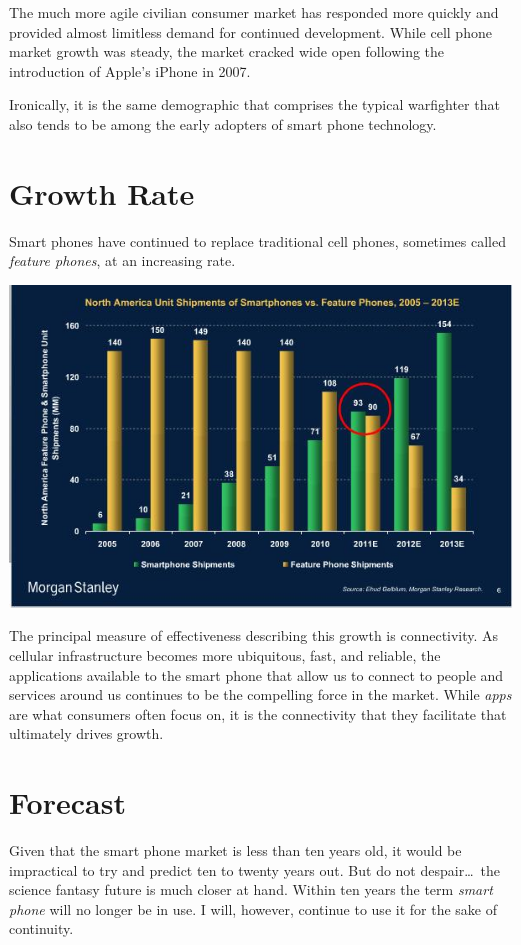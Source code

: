 \documentclass[letterpaper,12pt]{article}
\begin{document}
The much more agile civilian consumer market has responded more quickly and provided almost limitless demand for continued development.  While cell phone market growth was steady, the market cracked wide open following the introduction of Apple's iPhone in 2007.

Ironically, it is the same demographic that comprises the typical warfighter that also tends to be among the early adopters of smart phone technology.

\section*{Growth Rate}
Smart phones have continued to replace traditional cell phones, sometimes called \emph{feature phones}, at an increasing rate.  

\begin{center}
\includegraphics[scale=0.5]{images/growthRate}
\end{center} 

The principal measure of effectiveness describing this growth is connectivity. As cellular infrastructure becomes more ubiquitous, fast, and reliable, the applications available to the smart phone that allow us to connect to people and services around us continues to be the compelling force in the market.  While \emph{apps} are what consumers often focus on, it is the connectivity that they facilitate that ultimately drives growth.

\section*{Forecast}
Given that the smart phone market is less than ten years old, it would be impractical to try and predict ten to twenty years out.  But do not despair\dots\ the science fantasy future is much closer at hand.  Within ten years the term \emph{smart phone} will no longer be in use.  I will, however, continue to use it for the sake of continuity.
\end{document}
